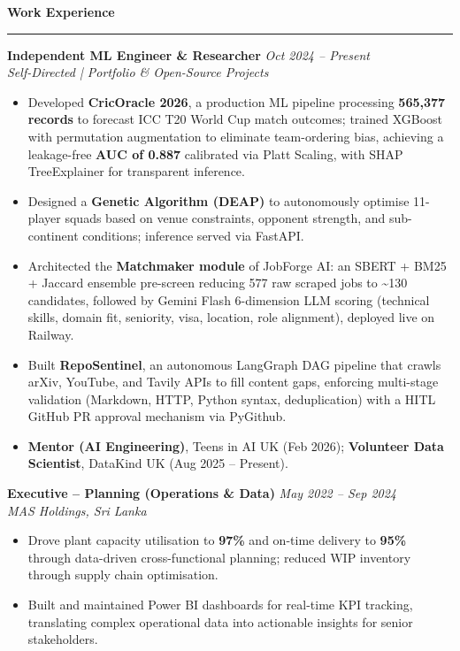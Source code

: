\documentclass[a4paper,10pt]{article}
\newcommand{\sect}[1]{\vspace{8pt}\noindent\textbf{\color{heading}\large #1}\vspace{3pt}\hrule\vspace{6pt}}
\begin{document}
\sect{Work Experience}

\noindent\textbf{Independent ML Engineer \& Researcher} \hfill \textit{Oct 2024 -- Present} \\
\textit{Self-Directed | Portfolio \& Open-Source Projects}
\begin{itemize}[leftmargin=*, topsep=4pt, itemsep=2pt]
    \item Developed \textbf{CricOracle 2026}, a production ML pipeline processing \textbf{565,377 records} to forecast ICC T20 World Cup match outcomes; trained XGBoost with permutation augmentation to eliminate team-ordering bias, achieving a leakage-free \textbf{AUC of 0.887} calibrated via Platt Scaling, with SHAP TreeExplainer for transparent inference.
    \item Designed a \textbf{Genetic Algorithm (DEAP)} to autonomously optimise 11-player squads based on venue constraints, opponent strength, and sub-continent conditions; inference served via FastAPI.
    \item Architected the \textbf{Matchmaker module} of JobForge AI: an SBERT + BM25 + Jaccard ensemble pre-screen reducing 577 raw scraped jobs to \textasciitilde130 candidates, followed by Gemini Flash 6-dimension LLM scoring (technical skills, domain fit, seniority, visa, location, role alignment), deployed live on Railway.
    \item Built \textbf{RepoSentinel}, an autonomous LangGraph DAG pipeline that crawls arXiv, YouTube, and Tavily APIs to fill content gaps, enforcing multi-stage validation (Markdown, HTTP, Python syntax, deduplication) with a HITL GitHub PR approval mechanism via PyGithub.
    \item \textbf{Mentor (AI Engineering)}, Teens in AI UK (Feb 2026); \textbf{Volunteer Data Scientist}, DataKind UK (Aug 2025 -- Present).
\end{itemize}
\vspace{4pt}

\noindent\textbf{Executive -- Planning (Operations \& Data)} \hfill \textit{May 2022 -- Sep 2024} \\
\textit{MAS Holdings, Sri Lanka}
\begin{itemize}[leftmargin=*, topsep=2pt, itemsep=1pt]
    \item Drove plant capacity utilisation to \textbf{97\%} and on-time delivery to \textbf{95\%} through data-driven cross-functional planning; reduced WIP inventory through supply chain optimisation.
    \item Built and maintained Power BI dashboards for real-time KPI tracking, translating complex operational data into actionable insights for senior stakeholders.
\end{itemize}
\vspace{4pt}
\end{document}
